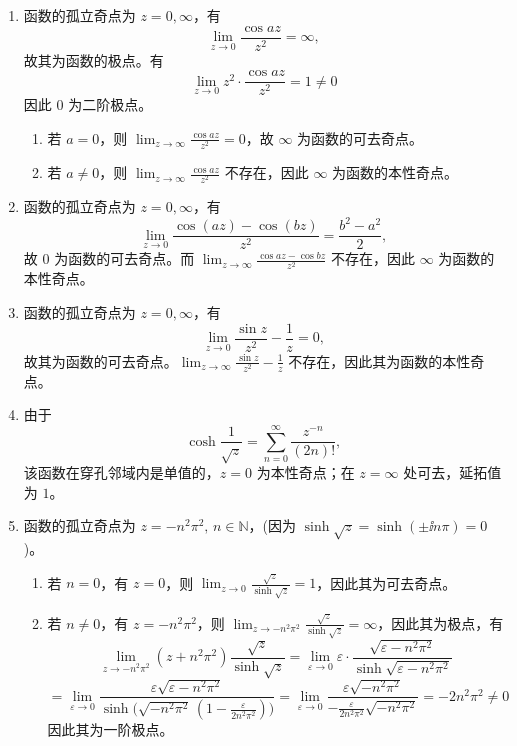 \begin{question}
\begin{solution}
\begin{enumerate}
  \item 函数的孤立奇点为 \(z=0,\infty\)，有
\[
\lim_{z\to 0} \frac{\cos a z}{z^2} = \infty,
\]
故其为函数的极点。有
\[
\lim_{z\to 0} z^2 \cdot \frac{\cos a z}{z^2} = 1 \neq 0
\]
因此 \(0\) 为二阶极点。

   \begin{enumerate}
     \item 若 \(a=0\)，则 \(\displaystyle\lim_{z\to\infty} \frac{\cos a z}{z^2} = 0\)，故 \(\infty\) 为函数的可去奇点。
     \item 若 \(a\neq 0\)，则 \(\displaystyle\lim_{z\to\infty} \frac{\cos a z}{z^2}\) 不存在，因此 \(\infty\) 为函数的本性奇点。

   \end{enumerate}
  \item 函数的孤立奇点为 \(z=0,\infty\)，有
\[
\lim_{z\to 0} \frac{\cos (a z) - \cos (b z)}{z^2}
=\frac{b^2-a^2}{2},
\]
故 \(0\) 为函数的可去奇点。而 \(\displaystyle\lim_{z\to\infty} \frac{\cos a z - \cos b z}{z^2}\) 不存在，因此 \(\infty\) 为函数的本性奇点。

  \item 函数的孤立奇点为 \(z=0,\infty\)，有
\[
\lim_{z\to 0} \frac{\sin z}{z^2} - \frac{1}{z} = 0,
\]
故其为函数的可去奇点。\(\displaystyle\lim_{z\to\infty} \frac{\sin z}{z^2} - \frac{1}{z}\) 不存在，因此其为函数的本性奇点。

  \item 由于
  \[
  \cosh\frac1{\sqrt z}
  =\sum_{n=0}^{\infty}\frac{z^{-n}}{(2n)!},
  \]
  该函数在穿孔邻域内是单值的，\(z=0\) 为本性奇点；在
  \(z=\infty\) 处可去，延拓值为 \(1\)。

  \item 函数的孤立奇点为 \(z = -n^2\pi^2,\,n\in\mathbb{N}\)，(因为 \(\sinh\sqrt{z} = \sinh(\pm \ii n\pi) = 0\))。

   \begin{enumerate}
     \item 若 \(n=0\)，有 \(z=0\)，则 \(\displaystyle\lim_{z\to 0} \frac{\sqrt{z}}{\sinh\sqrt{z}} = 1\)，因此其为可去奇点。
     \item 若 \(n\neq 0\)，有 \(z=-n^2\pi^2\)，则 \(\displaystyle\lim_{z\to -n^2\pi^2} \frac{\sqrt{z}}{\sinh\sqrt{z}} = \infty\)，因此其为极点，有
   \[
   \lim_{z\to -n^2\pi^2} (z+n^2\pi^2) \frac{\sqrt{z}}{\sinh\sqrt{z}}
   = \lim_{\varepsilon\to 0} \varepsilon \cdot \frac{\sqrt{\varepsilon - n^2\pi^2}}{\sinh\sqrt{\varepsilon - n^2\pi^2}}
   \]
   \[
   = \lim_{\varepsilon\to 0} \frac{\varepsilon\sqrt{\varepsilon - n^2\pi^2}}
        {\sinh\!\bigl(\sqrt{-n^2\pi^2}\,(1-\frac{\varepsilon}{2n^2\pi^2})\bigr)}
   = \lim_{\varepsilon\to 0} \frac{\varepsilon\sqrt{-n^2\pi^2}}
        {-\frac{\varepsilon}{2n^2\pi^2}\sqrt{-n^2\pi^2}}
   = -2n^2\pi^2 \neq 0
   \]
   因此其为一阶极点。


\end{enumerate}
\end{enumerate}
\end{solution}
\end{question}

